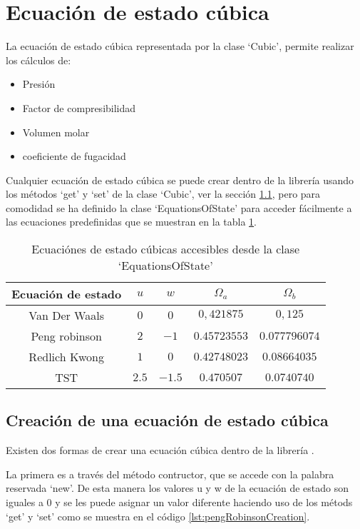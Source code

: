 \section{Ecuación de estado cúbica}\label{sec:cubic}

	La ecuación de estado cúbica representada por la clase `Cubic', permite realizar los cálculos de: 
	\begin{itemize}	\itemsep0ex
		\item Presión
		\item Factor de compresibilidad
		\item Volumen molar
		\item coeficiente de fugacidad
	\end{itemize}

	Cualquier ecuación de estado cúbica se puede crear dentro de la librería \Materia usando los métodos `get' y `set' de la clase `Cubic', ver la sección \ref{subsec:cubicCreation}, pero para comodidad se ha definido la clase `EquationsOfState' para acceder fácilmente a las ecuaciones predefinidas que se muestran en la tabla \ref{tab:cubics}.

	\begin{table}[!h]
		\centering
		\caption{Ecuaciónes de estado cúbicas accesibles desde la clase `EquationsOfState'}\label{tab:cubics}
		\begin{tabular}{|c |c | c | c | c |}
			\hline
			Ecuación de estado  & $u$ & $w$ & $\Omega_a$&$\Omega_b$\\
			\hline
			Van Der Waals  & $0$ & $0$ & $0,421875$ & $0,125$\\
			\hline
			Peng robinson  & $2$ & $-1$ & $0.45723553$ & $0.077796074$\\
			\hline
			Redlich Kwong  & $1$ & $0$ & $0.42748023$ & $0.08664035$\\
			\hline
			TST  & $2.5$ & $-1.5$ &$ 0.470507$ & $0.0740740$\\
			\hline
		\end{tabular}		
	\end{table}

\subsection{Creación de una ecuación de estado cúbica}\label{subsec:cubicCreation}

	Existen dos formas de crear una ecuación cúbica dentro de la librería \Materia.

	La primera es a través del método contructor, que se accede con la palabra reservada  `new'. De esta manera los valores u y w de la ecuación de estado son iguales a 0 y se les puede asignar un valor diferente haciendo uso de los métods `get' y `set' como se muestra en el código \ref{lst:pengRobinsonCreation}.

